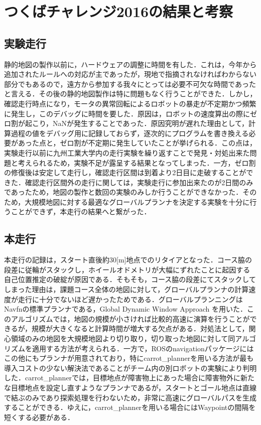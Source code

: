 \documentclass[10pt,a4paper]{jarticle}
\begin{document}
\section{つくばチャレンジ2016の結果と考察}
\label{sec:consider}
\subsection{実験走行}
静的地図の製作以前に，ハードウェアの調整に時間を有した．これは，今年から追加されたルールへの対応が主であったが，現地で指摘されなければわからない部分でもあるので，遠方から参加する我々にとっては必要不可欠な時間であったと言える．その後の静的地図製作は特に問題もなく行うことができた．しかし，確認走行時点になり，モータの異常回転によるロボットの暴走が不定期かつ頻繁に発生し，このデバッグに時間を要した．原因は，ロボットの速度算出の際にゼロ割が起こり，NaNが発生することであった．原因究明が遅れた理由として，計算過程の値をデバッグ用に記録しておらず，逐次的にプログラムを書き換える必要があった点と，ゼロ割が不定期に発生していたことが挙げられる．この点は，実験走行以前に九州工業大学内の走行実験を繰り返すことで発見・対処出来た問題と考えられるため，実験不足が露呈する結果となってしまった．一方，ゼロ割の修復後は安定して走行し，確認走行区間は到着より2日目に走破することができた．確認走行区間外の走行に関しては，実験走行に参加出来たのが2日間のみであったため，地図の製作と数回の実験のみしか行うことができなかった．そのため，大規模地図に対する最適なグローバルプランナを決定する実験を十分に行うことができず，本走行の結果へと繋がった．
\subsection{本走行}
本走行の記録は，スタート直後約30[m]地点でのリタイアとなった．コース脇の段差に従輪がスタックし，ホイールオドメトリが大幅にずれたことに起因する自己位置推定の破綻が原因である．そもそも，コース脇の段差にてスタックしてしまった理由は，課題コース全体の地図に対して，グローバルプランナの計算速度が走行に十分でないほど遅かったためである．グローバルプランニングはNavfnの標準プランナである，Global Dynamic Window Approach を用いた．このアルゴリズムでは，地図の規模が小さければ比較的高速に演算を行うことができるが，規模が大きくなると計算時間が増大する欠点がある\cite{navfn}．対処法として，関心領域のみの地図を大規模地図より切り取り，切り取った地図に対して同アルゴリズムを適用する方法が考えられる．一方で，ROSのnavigationパッケージにはこの他にもプランナが用意されており，特にcarrot\_plannerを用いる方法が最も導入コストの少ない解決法であることがチーム内の別ロボットの実験により判明した．carrot\_plannerでは，目標地点が障害物上にあった場合に障害物外に新たな目標地点を設定し直すようなプランナであるが，スタートとゴール地点は直線で結ぶのみであり探索処理を行わないため，非常に高速にグローバルパスを生成することができる．ゆえに，carrot\_plannerを用いる場合にはWaypointの間隔を短くする必要がある．
\end{document}
